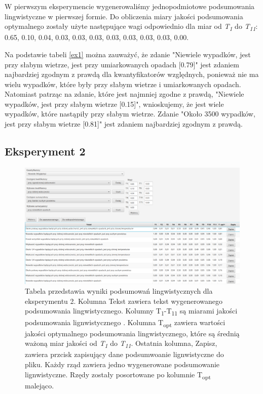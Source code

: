 \documentclass{classrep}
\begin{document}
W pierwszym eksperymencie wygenerowaliśmy jednopodmiotowe podsumowania lingwistyczne w pierwszej formie. Do obliczenia miary jakości podsumowania optymalnego zostały użyte następujące wagi odpowiednio dla miar od \textit{T\textsubscript{1}} do \textit{T\textsubscript{11}}: 0.65, 0.10, 0.04, 0.03, 0.03, 0.03, 0.03, 0.03, 0.03, 0.03, 0.00.

Na podstawie tabeli \ref{ex1} można zauważyć, że zdanie "Niewiele wypadków, jest przy słabym wietrze, jest przy umiarkowanych opadach [0.79]" jest zdaniem najbardziej zgodnym z prawdą dla kwantyfikatorów względnych, ponieważ nie ma wielu wypadków, które były przy słabym wietrze i umiarkowanych opadach. Natomiast patrząc na zdanie, które jest najmniej zgodne z prawdą, "Niewiele wypadków, jest przy słabym wietrze [0.15]", wnioskujemy, że jest wiele wypadków, które nastąpiły przy słabym wietrze. Zdanie "Około 3500 wypadków, jest przy słabym wietrze [0.81]" jest zdaniem najbardziej zgodnym z prawdą.


\newpage
\subsection{Eksperyment 2}
\label{section:ex2}
\begin{figure}[h!]
\centering
\includegraphics[width=15cm]{ex2.png}
\vspace{-0.3cm}
\caption{Tabela przedstawia wyniki podsumowań lingwistycznych dla eksperymentu 2. Kolumna Tekst zawiera tekst wygenerowanego podsumowania lingwistycznego. Kolumny  T\textsubscript{1}-T\textsubscript{11} są miarami jakości podsumowania lignwistycznego \cite{niewiadomski19}. Kolumna T\textsubscript{opt} zawiera wartości jakości optymalnego podsumowania lingwistycznego, które są średnią ważoną miar jakości od \textit{T\textsubscript{1}} do \textit{T\textsubscript{11}}. Ostatnia kolumna, Zapisz, zawiera przcisk zapisujący dane podsumwoanie lignwistyczne do pliku. Każdy rząd zawiera jedno wygenerowane podsumowanie lignwistyczne. Rzędy zostały posortowane po kolumnie T\textsubscript{opt} malejąco. }
\label{ex2}
\end{figure}
\end{document}

